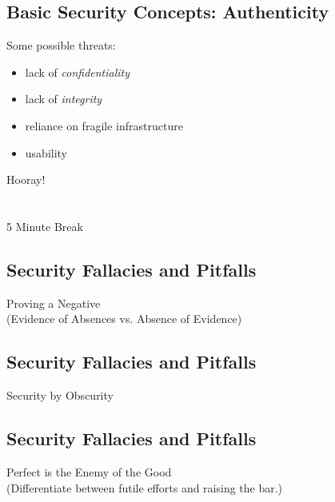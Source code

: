 \documentclass[xga]{xdvislides}
\begin{document}
\subsection{Basic Security Concepts: Authenticity}
Some possible threats:
\begin{itemize}
	\item lack of {\em confidentiality}
	\item lack of {\em integrity}
	\item reliance on fragile infrastructure
	\item usability
\end{itemize}

\newpage
\vspace*{\fill}
\begin{center}
    \Hugesize
        Hooray! \\ [1em]
    \hspace*{5mm}
    \blueline\\
    \hspace*{5mm}\\
        5 Minute Break
\end{center}
\vspace*{\fill}

\subsection{Security Fallacies and Pitfalls}
\vspace*{\fill}
\begin{center}
    \Hugesize
        Proving a Negative \\
	\vspace{.25in}
	\Normalsize
	(Evidence of Absences vs. Absence of Evidence)
\end{center}
\vspace*{\fill}


\subsection{Security Fallacies and Pitfalls}
\vspace*{\fill}
\begin{center}
    \Hugesize
        Security by Obscurity
\end{center}
\vspace*{\fill}

\subsection{Security Fallacies and Pitfalls}
\vspace*{\fill}
\begin{center}
    \Hugesize
        Perfect is the Enemy of the Good \\
	\vspace{.25in}
	\Normalsize
	(Differentiate between futile efforts and raising the bar.)
\end{center}
\vspace*{\fill}
\end{document}

